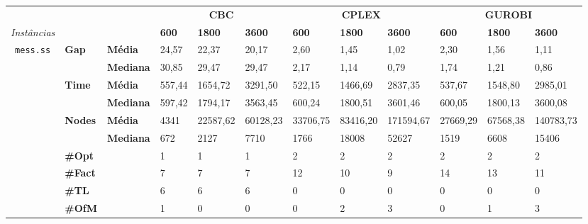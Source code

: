 
	\begin{footnotesize}	
	\caption{}
	\label{cflp:tab:5}
	\begin{tabular}{c@{\hskip 0.2cm}l@{\hskip 0.1cm}l|lll|lll|lll}
	& & & \multicolumn{3}{c}{\textbf{CBC}} & \multicolumn{3}{c}{\textbf{CPLEX}} & \multicolumn{3}{c}{\textbf{GUROBI}} 	\\\textit{Instâncias} & & & \textbf{600} & \textbf{1800} & \textbf{3600} & \textbf{600} & \textbf{1800} & \textbf{3600} & \textbf{600} & \textbf{1800} & \textbf{3600} \\
\hline
\multirow{7}{*}{\texttt{mess.ss}} & \multirow{2}{*}{\textbf{Gap}} & \textbf{Média} & 24,57 & 22,37 & 20,17 & 2,60 & 1,45 & 1,02 & 2,30 & 1,56 & 1,11 \\
 & & \textbf{Mediana} & 30,85 & 29,47 & 29,47 & 2,17 & 1,14 & 0,79 & 1,74 & 1,21 & 0,86 \\
\cline{2-12}
 & \multirow{2}{*}{\textbf{Time}} & \textbf{Média} & 557,44 & 1654,72 & 3291,50 & 522,15 & 1466,69 & 2837,35 & 537,67 & 1548,80 & 2985,01 \\
 & & \textbf{Mediana} & 597,42 & 1794,17 & 3563,45 & 600,24 & 1800,51 & 3601,46 & 600,05 & 1800,13 & 3600,08 \\
\cline{2-12}
 & \multirow{2}{*}{\textbf{Nodes}} & \textbf{Média} & 4341 & 22587,62 & 60128,23 & 33706,75 & 83416,20 & 171594,67 & 27669,29 & 67568,38 & 140783,73 \\
 & & \textbf{Mediana} & 672 & 2127 & 7710 & 1766 & 18008 & 52627 & 1519 & 6608 & 15406 \\
\cline{2-12}
 & \textbf{\#Opt} & & 1 & 1 & 1 & 2 & 2 & 2 & 2 & 2 & 2 \\
 & \textbf{\#Fact} & & 7 & 7 & 7 & 12 & 10 & 9 & 14 & 13 & 11 \\
 & \textbf{\#TL} & & 6 & 6 & 6 & 0 & 0 & 0 & 0 & 0 & 0 \\
 & \textbf{\#OfM} & & 1 & 0 & 0 & 0 & 2 & 3 & 0 & 1 & 3 \\
	\end{tabular}
	\end{footnotesize}

